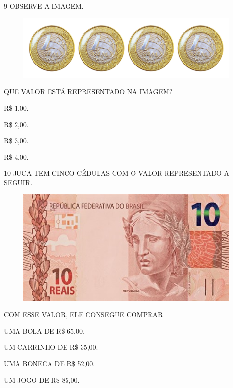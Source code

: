 \num{9} OBSERVE A IMAGEM.


\begin{figure}[H]
\centering
\includegraphics[width=\textwidth]{./media/SAEB_1ANO_MAT_FIGURA124.png}
\end{figure}

QUE VALOR ESTÁ REPRESENTADO NA IMAGEM?

\begin{multicols}{2}
\begin{escolha}
\item R\$ 1,00.

\item R\$ 2,00.

\item R\$ 3,00.

\item R\$ 4,00.
\end{escolha}
\end{multicols}

\num{10} JUCA TEM CINCO CÉDULAS COM O VALOR REPRESENTADO A SEGUIR.

\begin{figure}[H]
\centering
\includegraphics[width=.7\textwidth]{media/SAEB_1ANO_MAT_FIGURA82.jpg}
\end{figure}

COM ESSE VALOR, ELE CONSEGUE COMPRAR

\begin{escolha}%
\item UMA BOLA DE R\$ 65,00.

\item UM CARRINHO DE R\$ 35,00.

\item UMA BONECA DE R\$ 52,00.

\item UM JOGO DE R\$ 85,00.
\end{escolha}

